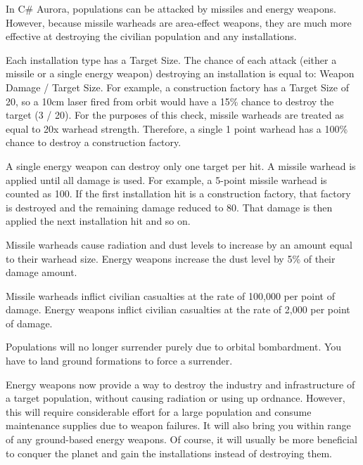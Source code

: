 \documentclass[../Aurora C# unofficial manual.tex]{subfiles}
\begin{document}
	In C\# Aurora, populations can be attacked by missiles and energy weapons. However, because missile warheads are area-effect weapons, they are much more effective at destroying the civilian population and any installations.
	
	Each installation type has a Target Size. The chance of each attack (either a missile or a single energy weapon) destroying an installation is equal to: Weapon Damage / Target Size. For example, a construction factory has a Target Size of 20, so a 10cm laser fired from orbit would have a 15\% chance to destroy the target (3 / 20). For the purposes of this check, missile warheads are treated as equal to 20x warhead strength. Therefore, a single 1 point warhead has a 100\% chance to destroy a construction factory.
	
	A single energy weapon can destroy only one target per hit. A missile warhead is applied until all damage is used. For example, a 5-point missile warhead is counted as 100. If the first installation hit is a construction factory, that factory is destroyed and the remaining damage reduced to 80. That damage is then applied the next installation hit and so on.
	
	Missile warheads cause radiation and dust levels to increase by an amount equal to their warhead size. Energy weapons increase the dust level by 5\% of their damage amount.
	
	Missile warheads inflict civilian casualties at the rate of 100,000 per point of damage. Energy weapons inflict civilian casualties at the rate of 2,000 per point of damage.
	
	Populations will no longer surrender purely due to orbital bombardment. You have to land ground formations to force a surrender.
	
	Energy weapons now provide a way to destroy the industry and infrastructure of a target population, without causing radiation or using up ordnance. However, this will require considerable effort for a large population and consume maintenance supplies due to weapon failures. It will also bring you within range of any ground-based energy weapons. Of course, it will usually be more beneficial to conquer the planet and gain the installations instead of destroying them.
	
\end{document}
